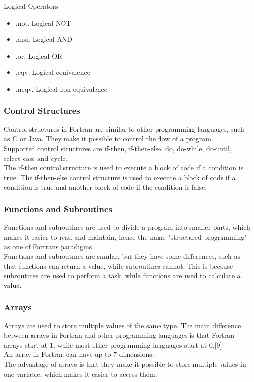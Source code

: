 \documentclass[12pt,a4paper]{scrartcl}
\begin{document}
Logical Operators
\begin{itemize}
\item .not. Logical NOT
\item .and. Logical AND
\item .or. Logical OR
\item .eqv. Logical equivalence
\item .neqv. Logical non-equivalence
\end{itemize}

\subsubsection{Control Structures}
Control structures in Fortran are similar to other programming languages, such as C or Java. They make it possible to control the flow of a program.\\
Supported control structures are if-then, if-then-else, do, do-while, do-until, select-case and cycle.\\
The if-then control structure is used to execute a block of code if a condition is true. The if-then-else control structure is used to execute a block of code if a condition is true and another block of code if the condition is false.

\subsubsection{Functions and Subroutines}
Functions and subroutines are used to divide a program into smaller parts, which makes it easier to read and maintain, hence the name "structured programming" as one of Fortrans paradigms.\\
Functions and subroutines are similar, but they have some differences, such as that functions can return a value, while subroutines cannot. This is because subroutines are used to perform a task, while functions are used to calculate a value.\\

\subsubsection{Arrays}
Arrays are used to store multiple values of the same type. The main difference between arrays in Fortran and other programming languages is that Fortran arrays start at 1, while most other programming languages start at 0.[9]\\
An array in Fortran can have up to 7 dimensions.\\
The advantage of arrays is that they make it possible to store multiple values in one variable, which makes it easier to access them.\\
\end{document}
